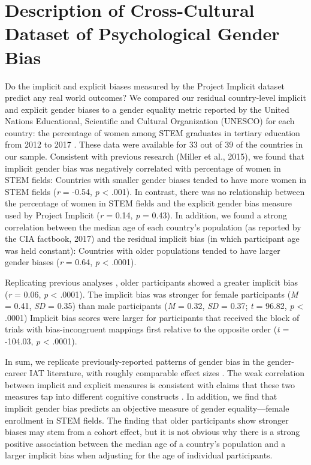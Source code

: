 \documentclass[9pt,twocolumn,twoside]{pnas-new}
\begin{document}
\section*{Description of Cross-Cultural Dataset of Psychological Gender
Bias}\label{description-of-cross-cultural-dataset-of-psychological-gender-bias}

Do the implicit and explicit biases measured by the Project Implicit
dataset predict any real world outcomes? We compared our residual
country-level implicit and explicit gender biases to a gender equality
metric reported by the United Nations Educational, Scientific and
Cultural Organization (UNESCO) for each country: the percentage of women
among STEM graduates in tertiary education from 2012 to 2017 \cite{miller2015women,stoet2018gender}. These data were available for 33 out
of 39 of the countries in our sample. Consistent with previous research
(Miller et al., 2015), we found that implicit gender bias was negatively
correlated with percentage of women in STEM fields: Countries with
smaller gender biases tended to have more women in STEM fields (\emph{r}
= -0.54, \emph{p} \textless{} .001). In contrast, there was no
relationship between the percentage of women in STEM fields and the
explicit gender bias measure used by Project Implicit (\emph{r} = 0.14,
\emph{p} = 0.43). In addition, we found a strong correlation between the
median age of each country's population (as reported by the CIA
factbook, 2017) and the residual implicit bias (in which participant age
was held constant): Countries with older populations tended to have
larger gender biases (\emph{r} = 0.64, \emph{p} \textless{} .0001).


Replicating previous analyses \cite{nosek2002harvesting}, older participants showed a greater implicit bias  (\emph{r} = 0.06, \emph{p} \textless{} .0001).  The implicit bias was stronger for female participants (\emph{M} = 0.41, \emph{SD} = 0.35)  than male participants
(\emph{M} = 0.32, \emph{SD} = 0.37; \emph{t} = 96.82, \emph{p}
\textless{} .0001) Implicit bias scores were larger for participants that received the block of trials with bias-incongruent mappings first
relative to the opposite order (\emph{t} = -104.03, \emph{p} \textless{}
.0001).



In sum, we replicate previously-reported patterns of gender bias in the
gender-career IAT literature, with roughly comparable effect sizes \cite[c.f.]{nosek2002harvesting}.
The weak correlation between implicit and
explicit measures is consistent with claims that these two measures tap
into different cognitive constructs \cite{forscher2016meta}. In
addition, we find that implicit gender bias predicts an objective measure of gender equality---female
enrollment in STEM fields. The
finding that older participants show stronger biases may stem from a
cohort effect, but it is not obvious why there is a strong positive
association between the median age of a country's population and a
larger implicit bias when adjusting for the age of individual
participants.
\end{document}
